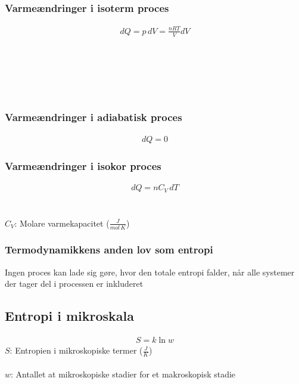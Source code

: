 	\subsubsection{Varmeændringer i isoterm proces}
		\begin{align}
			dQ=p\,dV=\frac{nRT}{V}dV
		\end{align}
		\varme\\
		\tryk\\
		\volumen\\
		\mol\\
		\idealgaskonst\\
		\tempk

	\subsubsection{Varmeændringer i adiabatisk proces}
		\begin{align}
			dQ=0
		\end{align}
		\varme

	\subsubsection{Varmeændringer i isokor proces}
		\begin{align}
			dQ=nC_V\,dT
		\end{align}
		\varme\\
		\mol\\
		$C_V$: Molare varmekapacitet ($\frac{J}{mol\,K}$)\\
		\tempk

	\subsubsection{Termodynamikkens anden lov som entropi}
		Ingen proces kan lade sig gøre, hvor den totale entropi falder, når alle systemer der tager del i processen er inkluderet
	
\subsection{Entropi i mikroskala}
	\begin{align}
		S=k\ln w
	\end{align}
	$S$: Entropien i mikroskopiske termer ($\frac{J}{K}$)\\
	\boltzkonst\\
	$w$: Antallet at mikroskopiske stadier for et makroskopisk stadie